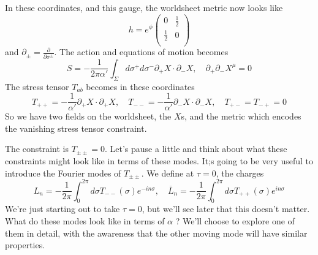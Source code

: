 \documentclass[11pt, oneside]{article}   	%
\theoremstyle{slanted}
\begin{document}
In these coordinates, and this gauge, the 
worldsheet metric 
now looks like 
\[
h  =e ^{ \phi } \begin{pmatrix}   0 & \frac{1}{2 } \\
\frac{1}{2 } & 0 \\ \end{pmatrix} 
\] and $ \partial  _{ \pm }  = \frac{\partial  }{\partial  \sigma ^{ \pm } }   $. 
The action and equations of motion 
becomes 
\[
S =  - \frac{1}{2 \pi \alpha ' } \int_{ \Sigma } d \sigma ^ + d \sigma ^  - 
\partial  _ + X \cdot  \partial  _ - X , \quad \partial  _+ \partial  _ - X ^ \mu  =0 
\] The stress 
tensor $ T _{ ab } $ becomes in these coordinates 
\[
T _{ ++ }   =  - \frac{1}{\alpha ' } \partial _ + X \cdot  \partial _ + X 
, \quad T _{ -- }  = - \frac{1}{ \alpha ' } \partial _ - X \cdot  \partial  _ - X , 
\quad T _{ + - }   = T _{ - +  } =0 
\] So we have two fields on the worldsheet, 
the $ X  $s, and the metric which encodes 
the vanishing stress tensor constraint. 

The constraint is  $ T _{ \pm \pm }  =0 $. 
Let's 
pause a little and think
about what these constraints 
might look like in 
terms of these modes. 
It;s going to be very useful to introduce 
the Fourier modes of $ T _{ \pm \pm } $. 
We define at $ \tau  = 0$, the charges 
\[
L _ n  = - \frac{1}{2 \pi } \int_{ 0 } ^{ 2 \pi } d \sigma T _{ -- } \left( \sigma  \right)  e ^{  - i n \sigma } , \quad 
\overline{ L } _ n  = -\frac{1}{2 \pi } \int _ 0 ^{ 2 \pi } d \sigma 
T _{ ++ } \left( \sigma  \right)  e ^{ i n \sigma }
\] We're just starting out to take $ \tau  = 0 $, 
but we'll see later that this doesn't matter. 
What do these modes look like in terms of $ \alpha $ ? 
We'll choose to explore one of them in detail, 
with the awareness that the other moving mode 
will have similar properties. 
\end{document}
